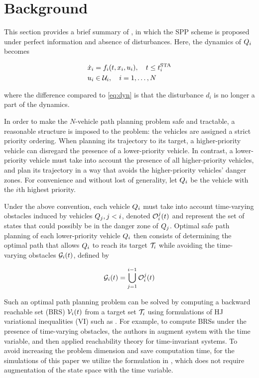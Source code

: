 \section{Background \label{sec:background}}
This section provides a brief summary of \cite{Chen15}, in which the SPP scheme is proposed under perfect information and absence of disturbances. Here, the dynamics of $Q_i$ becomes

\begin{equation}
\label{eq:dyn_no_dstb}
\begin{aligned}
\dot{x}_i &= f_i(t, x_i, u_i), \quad t \le t^\text{STA}_i \\
u_i &\in \mathcal{U}_i, \quad i = 1,\ldots, N
\end{aligned}
\end{equation}

\noindent where the difference compared to \eqref{eq:dyn} is that the disturbance $d_i$ is no longer a part of the dynamics.

In order to make the $N$-vehicle path planning problem safe and tractable, a reasonable structure is imposed to the problem: the vehicles are assigned a strict priority ordering. When planning its trajectory to its target, a higher-priority vehicle can disregard the presence of a lower-priority vehicle. In contrast, a lower-priority vehicle must take into account the presence of all higher-priority vehicles, and plan its trajectory in a way that avoids the higher-priority vehicles' danger zones. For convenience and without lost of generality, let $Q_i$ be the vehicle with the $i$th highest priority. 

Under the above convention, each vehicle $Q_i$ must take into account time-varying obstacles induced by vehicles $Q_j, j<i$, denoted $\mathcal{O}_i^j(t)$ and represent the set of states that could possibly be in the danger zone of $Q_j$. Optimal safe path planning of each lower-priority vehicle $Q_i$ then consists of determining the optimal path that allows $Q_i$ to reach its target $\mathcal{T}_i$ while avoiding the time-varying obstacles $\mathcal{G}_i(t)$, defined by

\begin{equation}
\label{eq:ioset}
\mathcal{G}_i(t) = \bigcup_{j=1}^{i-1}\mathcal{O}_i^j(t)
\end{equation}

Such an optimal path planning problem can be solved by computing a backward reachable set (BRS) $\mathcal{V}_i(t)$ from a target set $\mathcal{T}_i$ using formulations of HJ variational inequalities (VI) such as \cite{Barron90, Bokanowski10, Bokanowski11, Fisac15}. For example, to compute BRSs under the presence of time-varying obstacles, the authors in \cite{Bokanowski11} augment system with the time variable, and then applied reachability theory for time-invariant systems. To avoid increasing the problem dimension and save computation time, for the simulations of this paper we utilize the formulation in \cite{Fisac15}, which does not require augmentation of the state space with the time variable.

